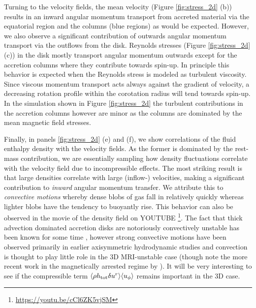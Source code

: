 \documentclass[fleqn,usenatbib]{mnras}
\begin{document}
Turning to the velocity fields, the mean velocity (Figure \ref{fig:stress_2d} (b)) results in an inward angular momentum transport from accreted material via the equatorial region and the columns (blue regions) as would be expected.  However, we also observe a significant contribution of outwards angular momentum transport via the outflows from the disk. 
Reynolds stresses (Figure \ref{fig:stress_2d} (c)) in the disk mostly transport angular momentum outwards except for the accretion columns where they contribute towards spin-up.  In principle this behavior is expected when the Reynolds stress is modeled as turbulent viscosity. 
Since viscous momentum transport acts always against the gradient of velocity, a decreasing rotation profile within the corotation radius will tend towards spin-up.  
In the simulation shown in Figure \ref{fig:stress_2d} the turbulent contributions in the accretion columns however are minor as the columns are dominated by the mean magnetic field stresses. 

Finally, in panels \ref{fig:stress_2d} (e) and (f), we show correlations of the fluid enthalpy density with the velocity fields.  As the former is dominated by the rest-mass contribution, we are essentially sampling how density fluctuations correlate with the velocity field due to incompressible effects.    
The most striking result is that large densities correlate with large (inflow-) velocities, making a significant contribution to \textit{inward} angular momentum transfer.  We attribute this to \textit{convective motions} whereby dense blobs of gas fall in relatively quickly whereas lighter blobs have the tendency to buoyantly rise.  This behavior can also be observed in the movie of the density field on YOUTUBE \footnote{\url{https://youtu.be/cCl6ZK5vjSM}}.  The fact that thick advection dominated accretion disks are notoriously convectively unstable has been known for some time \citep[][]{NarayanYi1994,QuataertGruzinov2000a,NarayanIgumenshchevEtAl2000}, however strong convective motions have been observed primarily in earlier axisymmetric hydrodynamic studies 
and convection is thought to play little role in the 3D MRI-unstable case \citep{StoneBalbus1996,HawleyBalbusEtAl2001} (though note the more recent work in the magnetically arrested regime by \cite{BegelmanScepiEtAl2021}).  
It will be very interesting to see if the compressible term $\langle \rho h_{\rm tot} \delta u^r\rangle\langle u_\phi\rangle$ remains important in the 3D case.  
\end{document}
